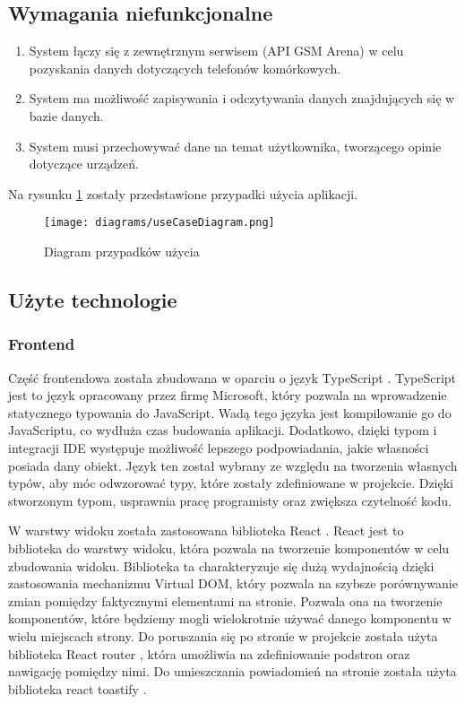\subsection{Wymagania niefunkcjonalne}
\begin{enumerate}
    \item System łączy się z zewnętrznym serwisem (API GSM Arena) w celu pozyskania danych dotyczących telefonów komórkowych.
    \item System ma możliwość zapisywania i odczytywania danych znajdujących się w bazie danych.
    \item System musi przechowywać dane na temat użytkownika, tworzącego opinie dotyczące urządzeń.
\end{enumerate}

\newpage
Na rysunku \ref*{use_case} zostały przedstawione przypadki użycia aplikacji.
\begin{figure}[H]
    \centering
    \texttt{[image: diagrams/useCaseDiagram.png]}
    \caption{Diagram przypadków użycia}
    \label{use_case}
\end{figure}


\subsection{Użyte technologie}
\subsubsection{Frontend}
Część frontendowa została zbudowana w oparciu o język TypeScript \cite{TypeScript}. TypeScript jest to język opracowany przez firmę Microsoft, który pozwala na wprowadzenie statycznego typowania do JavaScript. Wadą tego języka jest kompilowanie go do JavaScriptu, co wydłuża czas budowania aplikacji. Dodatkowo, dzięki typom i integracji IDE występuje możliwość lepszego podpowiadania, jakie własności posiada dany obiekt.
Język ten został wybrany ze względu na tworzenia własnych typów, aby móc odwzorować typy, które zostały zdefiniowane w projekcie. Dzięki stworzonym typom, usprawnia pracę programisty oraz zwiększa czytelność kodu. 

W warstwy widoku została zastosowana biblioteka React \cite{React}. React jest to biblioteka do warstwy widoku, która pozwala na tworzenie komponentów w celu zbudowania widoku. Biblioteka ta charakteryzuje się dużą wydajnością dzięki zastosowania mechanizmu Virtual DOM, który pozwala na szybsze porównywanie zmian pomiędzy faktycznymi elementami na stronie. Pozwala ona na tworzenie komponentów, które będziemy mogli wielokrotnie używać danego komponentu w wielu miejscach strony. Do poruszania się po stronie w projekcie została użyta biblioteka React router \cite{react_router}, która umożliwia na zdefiniowanie podstron oraz nawigację pomiędzy nimi. Do umieszczania powiadomień na stronie została użyta biblioteka react toastify \cite{react_toastify}.

